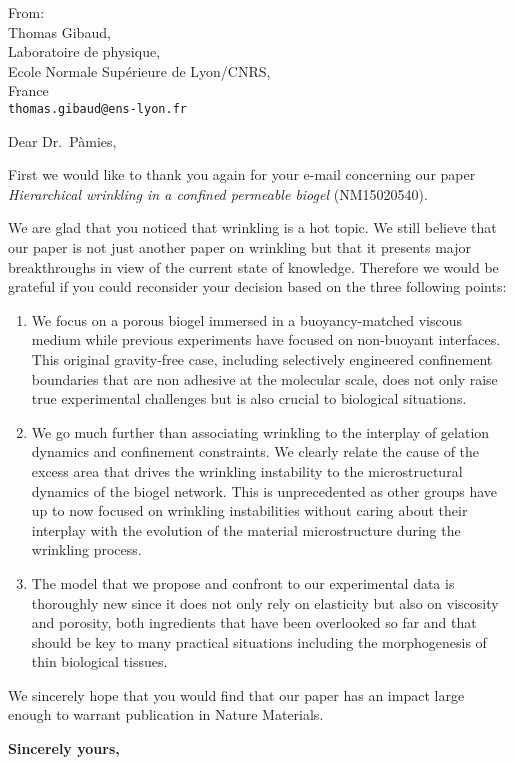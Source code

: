 \documentclass[a4paper, parskip=true, firsthead=false, fromemail=true, foldmarks=false]{scrlttr2}
\begin{document}
\begin{letter}{
\vspace{-10\baselineskip}
From:\\
Thomas Gibaud,\\
Laboratoire de physique,\\
Ecole Normale Supérieure de Lyon/CNRS,\\
France\\	
\texttt{thomas.gibaud@ens-lyon.fr}
}
\opening{Dear Dr.~Pàmies,}

\vspace{2\baselineskip}
First we would like to thank you again for your e-mail concerning our paper \emph{Hierarchical wrinkling in a confined permeable biogel} (NM15020540).

We are glad that you noticed that wrinkling is a hot topic. We still believe that our paper is not just another paper on wrinkling but that it presents major breakthroughs in view of the current state of knowledge. Therefore we would be grateful if you could reconsider your decision based on the three following points:
\begin{enumerate}

\item We focus on a porous biogel immersed in a buoyancy-matched viscous medium while previous experiments have focused on non-buoyant interfaces. This original gravity-free case, including selectively engineered confinement boundaries that are non adhesive at the molecular scale, does not only raise true experimental challenges but is also crucial to biological situations.


\item We go much further than associating wrinkling to the interplay of gelation dynamics and confinement constraints. We clearly relate the cause of the excess area that drives the wrinkling instability to the microstructural dynamics of the biogel network. This is unprecedented as other groups have up to now focused on wrinkling instabilities without caring about their interplay with the evolution of the material microstructure during the wrinkling process.

\item The model that we propose and confront to our experimental data is thoroughly new since it does not only rely on elasticity but also on viscosity and porosity, both ingredients that have been overlooked so far and that should be key to many practical situations including the morphogenesis of thin biological tissues.

\end{enumerate}

We sincerely hope that you would find that our paper has an impact large enough to warrant publication in Nature Materials.

\closing{\bf Sincerely yours,} 

\end{letter} 
\end{document}
